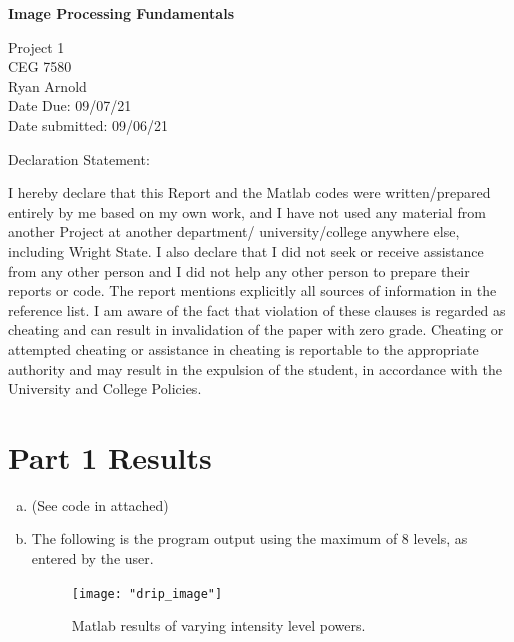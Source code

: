 \documentclass[../report1_rarnold.tex]{subfiles}
\begin{document}


\begin{titlepage}
\begin{Large}
\begin{center} 
\textbf{Image Processing Fundamentals} \\
\end{center}
\end{Large}
Project 1\\
CEG 7580\\
Ryan Arnold \\
Date Due: 09/07/21 \\
Date submitted: 09/06/21
\vspace{24pt}

\noindent Declaration Statement: 

\noindent I hereby declare that this Report and the Matlab codes were written/prepared entirely by me based on my own work, and I have not used any material from another Project at another department/ university/college anywhere else, including Wright State. I also declare that I did not seek or receive assistance from any other person and I did not help any other person to prepare their reports or code.  The report mentions explicitly all sources of information in the reference list. I am aware of the fact that violation of these clauses is regarded as cheating and can result in invalidation of the paper with zero grade. Cheating or attempted cheating or assistance in cheating is reportable to the appropriate authority and may result in the expulsion of the student, in accordance with the University and College Policies.

\end{titlepage}

\clearpage

\section*{Part 1 Results}

\begin{enumerate}[a.]
  \item (See code in attached)
  
  \item The following is the program output using the maximum of 8 levels, as entered by the user.
  \begin{figure}[htbp]
	\centering
	\texttt{[image: "drip\_image"]}
	\caption{Matlab results of varying intensity level powers.} 
	\label{1a}
	\end{figure}

\end{enumerate}
\end{document}
